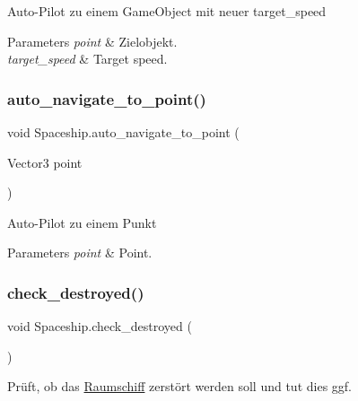 Auto-\/\+Pilot zu einem Game\+Object mit neuer target\+\_\+speed 


\begin{DoxyParams}{Parameters}
{\em point} & Zielobjekt.\\
\hline
{\em target\+\_\+speed} & Target speed.\\
\hline
\end{DoxyParams}
\mbox{\label{class_spaceship_a43e9cd085c3e2cdec0122b6f4b3c6456}} 
\subsubsection{\texorpdfstring{auto\+\_\+navigate\+\_\+to\+\_\+point()}{auto\_navigate\_to\_point()}}
{\footnotesize\ttfamily void Spaceship.\+auto\+\_\+navigate\+\_\+to\+\_\+point (\begin{DoxyParamCaption}\item[{Vector3}]{point }\end{DoxyParamCaption})}



Auto-\/\+Pilot zu einem Punkt 


\begin{DoxyParams}{Parameters}
{\em point} & Point.\\
\hline
\end{DoxyParams}
\mbox{\label{class_spaceship_a3f59582cf969851ab6633b4cf1047f20}} 
\subsubsection{\texorpdfstring{check\+\_\+destroyed()}{check\_destroyed()}}
{\footnotesize\ttfamily void Spaceship.\+check\+\_\+destroyed (\begin{DoxyParamCaption}{ }\end{DoxyParamCaption})}



Prüft, ob das \hyperlink{class_raumschiff}{Raumschiff} zerstört werden soll und tut dies ggf. 

\mbox{\label{class_spaceship_a2e51bf3ac0ada83d93bb8a474994a210}} 

